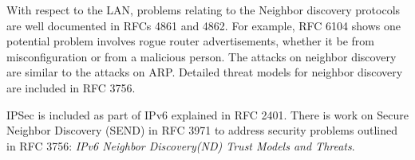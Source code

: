 With respect to the LAN, problems relating to the Neighbor discovery
protocols are well documented in RFCs 4861 and 4862.  For example,
RFC 6104 shows one potential problem involves rogue router 
advertisements, whether it be from misconfiguration or from a malicious person.
The attacks on neighbor discovery are similar to the attacks on ARP.
Detailed threat models for neighbor discovery are included in RFC 3756.

IPSec is included as part of IPv6 explained in RFC 2401.  There is work
on Secure Neighbor Discovery (SEND) in RFC 3971 
to address security problems outlined in RFC 3756: \textit{IPv6
Neighbor Discovery(ND) Trust Models and Threats}.

